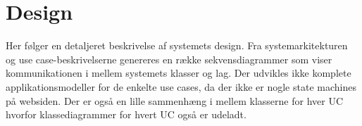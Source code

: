\chapter{Design}
Her følger en detaljeret beskrivelse af systemets design. Fra systemarkitekturen og use case-beskrivelserne genereres en række sekvensdiagrammer som viser kommunikationen i mellem systemets klasser og lag. Der udvikles ikke komplete applikationsmodeller for de enkelte use cases, da der ikke er nogle state machines på websiden. Der er også en lille sammenhæng i mellem klasserne for hver UC hvorfor klassediagrammer for hvert UC også er udeladt.





